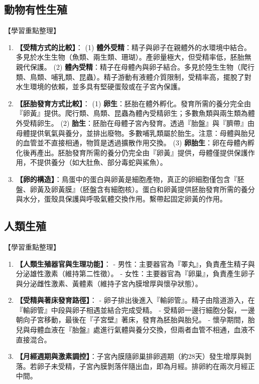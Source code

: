 \documentclass[11pt,a4paper]{article}
\begin{document}
\subsection{動物有性生殖}
\begin{learningpoints}{【學習重點整理】}
\begin{enumerate}[label=\arabic*.]
  \item \textbf{【受精方式的比較】}：
  (1) \textbf{體外受精}：精子與卵子在親體外的水環境中結合。多見於水生生物（魚類、兩生類、珊瑚）。產卵量極大，但受精率低，胚胎無親代保護。
  (2) \textbf{體內受精}：精子在母體內與卵子結合。多見於陸生生物（爬行類、鳥類、哺乳類、昆蟲）。精子游動有液體介質限制，受精率高，擺脫了對水生環境的依賴，並多具有堅硬蛋殼或在子宮內保護。
  \item \textbf{【胚胎發育方式比較】}：
  (1) \textbf{卵生}：胚胎在體外孵化。發育所需的養分完全由『卵黃』提供。爬行類、鳥類、昆蟲為體內受精卵生；多數魚類與兩生類為體外受精卵生。
  (2) \textbf{胎生}：胚胎在母體子宮內發育。透過『胎盤』與『臍帶』由母體提供氧氣與養分，並排出廢物。多數哺乳類屬於胎生。注意：母體與胎兒的血管並不直接相通，物質是透過擴散作用交換。
  (3) \textbf{卵胎生}：卵在母體內孵化後再產出。胚胎發育所需的養分仍完全由『卵黃』提供，母體僅提供保護作用，不提供養分（如大肚魚、部分毒蛇與鯊魚）。
  \item \textbf{【卵的構造】}：鳥蛋中的蛋白與卵黃是細胞產物，真正的卵細胞僅包含『胚盤、卵黃及卵黃膜』（胚盤含有細胞核）。蛋白和卵黃提供胚胎發育所需的養分與水分，蛋殼具保護與呼吸氣體交換作用。繫帶起固定卵黃的作用。
\end{enumerate}
\end{learningpoints}

\subsection{人類生殖}
\begin{learningpoints}{【學習重點整理】}
\begin{enumerate}[label=\arabic*.]
  \item \textbf{【人類生殖器官與生理功能】}：
  - 男性：主要器官為『睪丸』，負責產生精子與分泌雄性激素（維持第二性徵）。
  - 女性：主要器官為『卵巢』，負責產生卵子與分泌雌性激素、黃體素（維持子宮內膜增厚與懷孕狀態）。
  \item \textbf{【受精與著床發育路徑】}：
  - 卵子排出後進入『輸卵管』。精子由陰道游入，在『輸卵管』中段與卵子相遇並結合完成受精。
  - 受精卵一邊行細胞分裂，一邊朝向子宮移動，最後在『子宮壁』著床，發育為胚胎與胎兒。
  - 懷孕期間，胎兒與母體血液在『胎盤』處進行氣體與養分交換，但兩者血管不相通，血液不直接混合。
  \item \textbf{【月經週期與激素調控】}：子宮內膜隨卵巢排卵週期（約28天）發生增厚與剝落。若卵子未受精，子宮內膜剝落伴隨出血，即為月經。排卵約在兩次月經正中間。
\end{enumerate}
\end{learningpoints}
\end{document}
